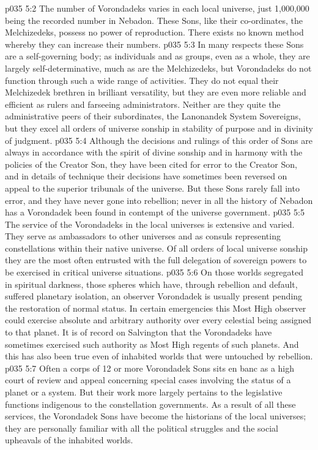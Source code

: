 \vs p035 5:2 \pc The number of Vorondadeks varies in each local universe, just 1,000,000 being the recorded number in Nebadon. These Sons, like their co\hyp{}ordinates, the Melchizedeks, possess no power of reproduction. There exists no known method whereby they can increase their numbers.
\vs p035 5:3 \pc In many respects these Sons are a self\hyp{}governing body; as individuals and as groups, even as a whole, they are largely self\hyp{}determinative, much as are the Melchizedeks, but Vorondadeks do not function through such a wide range of activities. They do not equal their Melchizedek brethren in brilliant versatility, but they are even more reliable and efficient as rulers and farseeing administrators. Neither are they quite the administrative peers of their subordinates, the Lanonandek System Sovereigns, but they excel all orders of universe sonship in stability of purpose and in divinity of judgment.
\vs p035 5:4 Although the decisions and rulings of this order of Sons are always in accordance with the spirit of divine sonship and in harmony with the policies of the Creator Son, they have been cited for error to the Creator Son, and in details of technique their decisions have sometimes been reversed on appeal to the superior tribunals of the universe. But these Sons rarely fall into error, and they have never gone into rebellion; never in all the history of Nebadon has a Vorondadek been found in contempt of the universe government.
\vs p035 5:5 The service of the Vorondadeks in the local universes is extensive and varied. They serve as ambassadors to other universes and as consuls representing constellations within their native universe. Of all orders of local universe sonship they are the most often entrusted with the full delegation of sovereign powers to be exercised in critical universe situations.
\vs p035 5:6 On those worlds segregated in spiritual darkness, those spheres which have, through rebellion and default, suffered planetary isolation, an observer Vorondadek is usually present pending the restoration of normal status. In certain emergencies this Most High observer could exercise absolute and arbitrary authority over every celestial being assigned to that planet. It is of record on Salvington that the Vorondadeks have sometimes exercised such authority as Most High regents of such planets. And this has also been true even of inhabited worlds that were untouched by rebellion.
\vs p035 5:7 Often a corps of 12 or more Vorondadek Sons sits en banc as a high court of review and appeal concerning special cases involving the status of a planet or a system. But their work more largely pertains to the legislative functions indigenous to the constellation governments. As a result of all these services, the Vorondadek Sons have become the historians of the local universes; they are personally familiar with all the political struggles and the social upheavals of the inhabited worlds.

